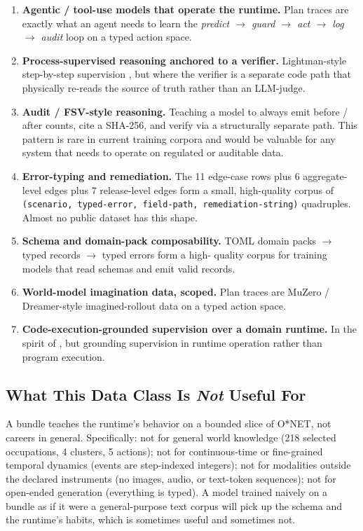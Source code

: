 \documentclass[10pt,twocolumn,letterpaper]{article}
\newcommand{\code}[1]{\texttt{\small #1}}
\begin{document}
\begin{enumerate}[leftmargin=1.2em]
\item \textbf{Agentic / tool-use models that operate the runtime.}
      Plan traces are exactly what an agent needs to learn the
      \emph{predict $\to$ guard $\to$ act $\to$ log $\to$ audit}
      loop on a typed action space.
\item \textbf{Process-supervised reasoning anchored to a verifier.}
      Lightman-style step-by-step supervision
      \citep{lightman2023verify}, but where the verifier is a
      separate code path that physically re-reads the source of
      truth rather than an LLM-judge.
\item \textbf{Audit / FSV-style reasoning.} Teaching a model to
      always emit before / after counts, cite a SHA-256, and verify
      via a structurally separate path. This pattern is rare in
      current training corpora and would be valuable for any system
      that needs to operate on regulated or auditable data.
\item \textbf{Error-typing and remediation.} The 11 edge-case rows
      plus 6 aggregate-level edges plus 7 release-level edges form
      a small, high-quality corpus of \code{(scenario, typed-error,
      field-path, remediation-string)} quadruples. Almost no public
      dataset has this shape.
\item \textbf{Schema and domain-pack composability.} TOML domain
      packs $\to$ typed records $\to$ typed errors form a high-
      quality corpus for training models that read schemas and
      emit valid records.
\item \textbf{World-model imagination data, scoped.} Plan traces
      are MuZero / Dreamer-style imagined-rollout data on a typed
      action space.
\item \textbf{Code-execution-grounded supervision over a domain
      runtime.} In the spirit of \citep{jung2025codeexec}, but
      grounding supervision in runtime operation rather than
      program execution.
\end{enumerate}

\subsection{What This Data Class Is \emph{Not} Useful For}

A bundle teaches the runtime's behavior on a bounded slice of
O*NET, not careers in general. Specifically: not for general world
knowledge (218 selected occupations, 4 clusters, 5 actions); not
for continuous-time or fine-grained temporal dynamics (events are
step-indexed integers); not for modalities outside the declared
instruments (no images, audio, or text-token sequences); not for
open-ended generation (everything is typed). A model trained
naively on a bundle as if it were a general-purpose text corpus
will pick up the schema and the runtime's habits, which is
sometimes useful and sometimes not.
\end{document}
